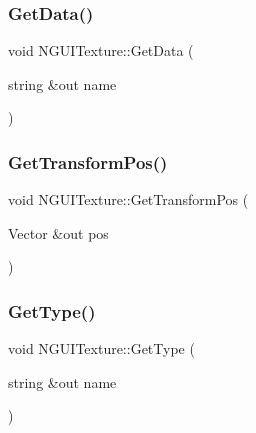 \hypertarget{class_n_g_u_i_texture_a15f2d656d5da12b951e09d50f717e7e9}{}\label{class_n_g_u_i_texture_a15f2d656d5da12b951e09d50f717e7e9} 
\subsubsection{\texorpdfstring{Get\+Data()}{GetData()}}
{\footnotesize\ttfamily void N\+G\+U\+I\+Texture\+::\+Get\+Data (\begin{DoxyParamCaption}\item[{string \&out}]{name }\end{DoxyParamCaption})}

\hypertarget{class_n_g_u_i_texture_a8904479dd74cd237e4c478a4c2ed78f4}{}\label{class_n_g_u_i_texture_a8904479dd74cd237e4c478a4c2ed78f4} 
\subsubsection{\texorpdfstring{Get\+Transform\+Pos()}{GetTransformPos()}}
{\footnotesize\ttfamily void N\+G\+U\+I\+Texture\+::\+Get\+Transform\+Pos (\begin{DoxyParamCaption}\item[{Vector \&out}]{pos }\end{DoxyParamCaption})}

\hypertarget{class_n_g_u_i_texture_ab878082ab5011b04424def1dcfaf03d3}{}\label{class_n_g_u_i_texture_ab878082ab5011b04424def1dcfaf03d3} 
\subsubsection{\texorpdfstring{Get\+Type()}{GetType()}}
{\footnotesize\ttfamily void N\+G\+U\+I\+Texture\+::\+Get\+Type (\begin{DoxyParamCaption}\item[{string \&out}]{name }\end{DoxyParamCaption})}

\hypertarget{class_n_g_u_i_texture_ae354cba67d07f4151d1449875227651a}{}\label{class_n_g_u_i_texture_ae354cba67d07f4151d1449875227651a} 
